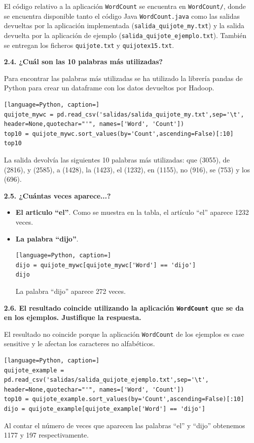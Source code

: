 \documentclass[10pt,swedish, openany]{book}
\begin{document}
El código relativo a la aplicación \texttt{WordCount} se encuentra en \texttt{WordCount/}, donde se encuentra disponible tanto el código Java \texttt{WordCount.java} como las salidas devueltas por la aplicación implementada (\texttt{salida\_quijote\_my.txt}) y la salida devuelta por la aplicación de ejemplo (\texttt{salida\_quijote\_ejemplo.txt}). También se entregan los ficheros \texttt{quijote.txt} y \texttt{quijotex15.txt}.

\vspace{0.8em}

\textbf{2.4. ¿Cuál son las 10 palabras más utilizadas?}

Para encontrar las palabras más utilizadas se ha utilizado la librería pandas de Python para crear un dataframe con los datos devueltos por Hadoop.

\begin{lstlisting}[language=Python, caption=]
quijote_mywc = pd.read_csv('salidas/salida_quijote_my.txt',sep='\t', header=None,quotechar="'", names=['Word', 'Count'])
top10 = quijote_mywc.sort_values(by='Count',ascending=False)[:10]
top10
\end{lstlisting}
La salida devolvía las siguientes 10 palabras más utilizadas: que (3055), de (2816), y (2585), a (1428), la (1423), el (1232), en (1155), no (916), se (753) y los (696).

\vspace{0.8em}

\textbf{2.5. ¿Cuántas veces aparece...?}
 \begin{itemize}
     \item \textbf{El articulo “el”}. Como se muestra en la tabla, el artículo ``el'' aparece 1232 veces.
     \item \textbf{La palabra “dijo”}. 
     \begin{lstlisting}[language=Python, caption=]
dijo = quijote_mywc[quijote_mywc['Word'] == 'dijo']
dijo
     \end{lstlisting}
     La palabra ``dijo'' aparece 272 veces.\newline
 \end{itemize}
 
\vspace{0.8em}

\textbf{2.6. El resultado coincide utilizando la aplicación \texttt{WordCount}
 que se da en los ejemplos. Justifique la respuesta.}

El resultado no coincide porque la aplicación \texttt{WordCount} de los ejemplos es case sensitive y le afectan los caracteres no alfabéticos. 
\begin{lstlisting}[language=Python, caption=]
quijote_example = pd.read_csv('salidas/salida_quijote_ejemplo.txt',sep='\t', header=None,quotechar="'", names=['Word', 'Count'])
top10 = quijote_example.sort_values(by='Count',ascending=False)[:10]
dijo = quijote_example[quijote_example['Word'] == 'dijo']
\end{lstlisting}
Al contar el número de veces que aparecen las palabras ``el'' y ``dijo'' obtenemos 1177 y 197 respectivamente. 
\end{document}
